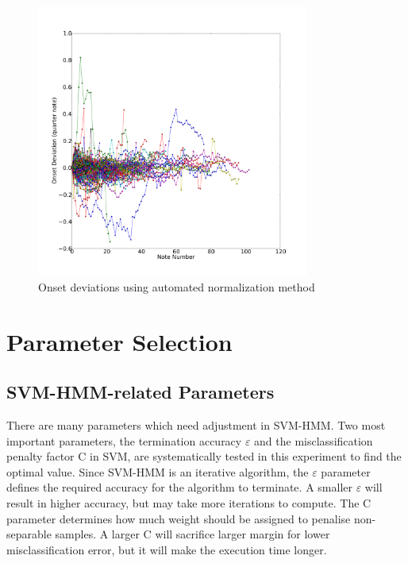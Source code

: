 
\begin{figure}[tp]
   \begin{center}
      \includegraphics[width=0.8\textwidth]{fig/lian_onset_1}
   \end{center}
   \caption{Onset deviations using automated normalization method}
   \label{fig:normauto}
\end{figure}


\section{Parameter Selection}
\label{sec:paramselect}
\subsection{SVM-HMM-related Parameters}
There are many parameters which need adjustment in SVM-HMM. Two most important parameters, the termination accuracy $\varepsilon$ and the misclassification penalty factor C in SVM, are systematically tested in this experiment to find the optimal value. Since SVM-HMM is an iterative algorithm, the $\varepsilon$ parameter defines the required accuracy for the algorithm to terminate. A smaller $\varepsilon$ will result in higher accuracy, but may take more iterations to compute. The C parameter determines how much weight should be assigned to penalise non-separable samples. A larger C will sacrifice larger margin for lower misclassification error, but it will make the execution time longer.%

